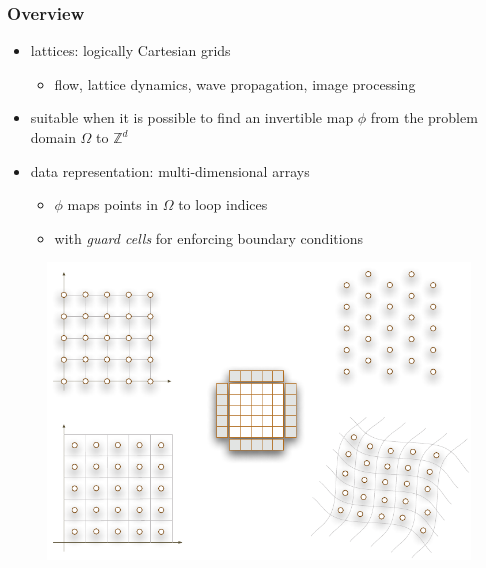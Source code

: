 %
%
%
%


\begin{frame}[fragile]
%
  \frametitle{Overview}
%
  \begin{itemize}
%
  \item lattices: logically Cartesian grids
    \begin{itemize}
    \item flow, lattice dynamics, wave propagation, image processing
    \end{itemize}
%
  \item suitable when it is possible to find an invertible map $\phi$ from the problem domain
    $\Omega$ to $\mathbb{Z}^{d}$
%
  \item data representation: multi-dimensional arrays
    \begin{itemize}
    \item $\phi$ maps points in $\Omega$ to loop indices
    \item with {\em guard cells} for enforcing boundary conditions
    \end{itemize}
% 
  \end{itemize}
%
  \begin{figure}
    \includegraphics[scale=0.5]{figures/structured.pdf}
  \end{figure} 
%
\end{frame}

